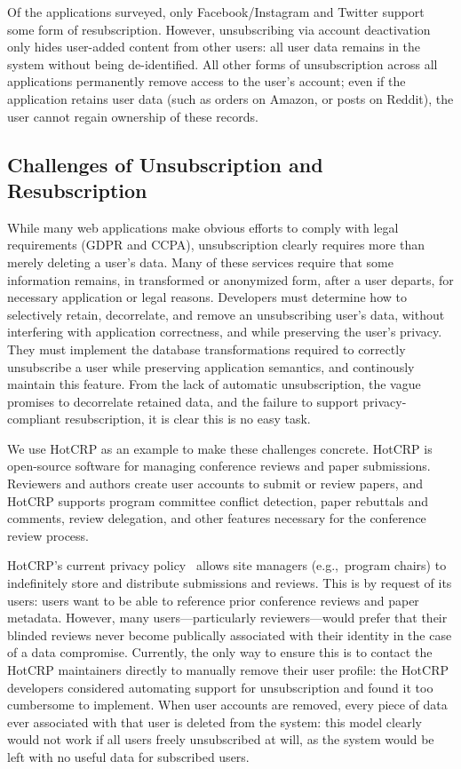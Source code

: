 Of the applications surveyed, only Facebook/Instagram and Twitter support some form of
resubscription. However, unsubscribing via account deactivation only hides user-added content from
other users: all user data remains in the system without being de-identified.  All other forms of
unsubscription across all applications permanently remove access to the user's account; even if the
application retains user data (such as orders on Amazon, or posts on Reddit), the user cannot regain
ownership of these records.

\subsection{Challenges of Unsubscription and Resubscription}
While many web applications make obvious efforts to comply with legal requirements (GDPR and CCPA),
unsubscription clearly requires more than merely deleting a user's data. Many of these services
require that some information remains, in transformed or anonymized form, after a user departs, for
necessary application or legal reasons. 
%
Developers must determine how to selectively retain, decorrelate, and remove an unsubscribing user's data,
without interfering with application correctness, and while preserving the user's privacy. They must 
implement the database transformations required to correctly unsubscribe a user while
preserving application semantics, and continously maintain this feature. 
%
From the lack of automatic unsubscription, the vague promises to decorrelate retained data, and the
failure to support privacy-compliant resubscription, it is clear this is no easy task.
%

We use HotCRP as an example to make these challenges concrete. HotCRP is open-source software for
managing conference reviews and paper submissions.  Reviewers and authors create user accounts to
submit or review papers, and HotCRP supports program committee conflict detection, paper rebuttals
and comments, review delegation, and other features necessary for the conference review process.

HotCRP's current privacy policy~\cite{hotcrp:privacy} allows site managers (e.g.,\ program chairs)
to indefinitely store and distribute submissions and reviews.  This is by request of its users:
users want to be able to reference prior conference reviews and paper metadata.  However, many
users---particularly reviewers---would prefer that their blinded reviews never become publically
associated with their identity in the case of a data compromise. Currently, the only way to ensure
this is to contact the HotCRP maintainers directly to manually remove their user profile: the HotCRP
developers considered automating support for unsubscription and found it too cumbersome to
implement.  When user accounts are removed, every piece of data ever associated with that
user is deleted from the system: this model clearly would not work if all users freely
unsubscribed at will, as the system would be left with no useful data for subscribed users.

